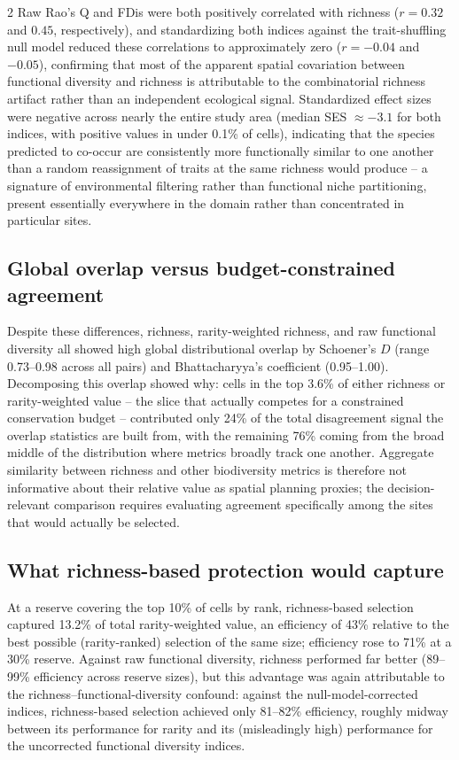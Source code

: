 \begin{spacing}{2}
Raw Rao's Q and FDis were both positively correlated with richness ($r = 0.32$ and $0.45$, respectively), and standardizing both indices against the trait-shuffling null model reduced these correlations to approximately zero ($r = -0.04$ and $-0.05$), confirming that most of the apparent spatial covariation between functional diversity and richness is attributable to the combinatorial richness artifact rather than an independent ecological signal. Standardized effect sizes were negative across nearly the entire study area (median SES $\approx -3.1$ for both indices, with positive values in under 0.1\% of cells), indicating that the species predicted to co-occur are consistently more functionally similar to one another than a random reassignment of traits at the same richness would produce -- a signature of environmental filtering rather than functional niche partitioning, present essentially everywhere in the domain rather than concentrated in particular sites.

\subsection{Global overlap versus budget-constrained agreement}
Despite these differences, richness, rarity-weighted richness, and raw functional diversity all showed high global distributional overlap by Schoener's $D$ (range 0.73--0.98 across all pairs) and Bhattacharyya's coefficient (0.95--1.00). Decomposing this overlap showed why: cells in the top 3.6\% of either richness or rarity-weighted value -- the slice that actually competes for a constrained conservation budget -- contributed only 24\% of the total disagreement signal the overlap statistics are built from, with the remaining 76\% coming from the broad middle of the distribution where metrics broadly track one another. Aggregate similarity between richness and other biodiversity metrics is therefore not informative about their relative value as spatial planning proxies; the decision-relevant comparison requires evaluating agreement specifically among the sites that would actually be selected.

\subsection{What richness-based protection would capture}
At a reserve covering the top 10\% of cells by rank, richness-based selection captured 13.2\% of total rarity-weighted value, an efficiency of 43\% relative to the best possible (rarity-ranked) selection of the same size; efficiency rose to 71\% at a 30\% reserve. Against raw functional diversity, richness performed far better (89--99\% efficiency across reserve sizes), but this advantage was again attributable to the richness--functional-diversity confound: against the null-model-corrected indices, richness-based selection achieved only 81--82\% efficiency, roughly midway between its performance for rarity and its (misleadingly high) performance for the uncorrected functional diversity indices.


\end{spacing}
